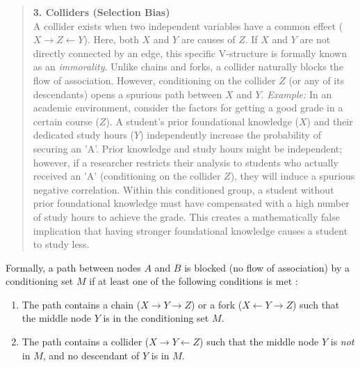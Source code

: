 \begin{quote}
\textbf{3. Colliders (Selection Bias)}\\
A collider exists when two independent variables have a common effect ($X \rightarrow Z \leftarrow Y$). Here, both $X$ and $Y$ are causes of $Z$. If $X$ and $Y$ are not directly connected by an edge, this specific V-structure is formally known as an \textit{immorality}. 
Unlike chains and forks, a collider naturally blocks the flow of association. However, conditioning on the collider $Z$ (or any of its descendants) opens a spurious path between $X$ and $Y$. 
\textit{Example:} In an academic environment, consider the factors for getting a good grade in a certain course ($Z$). A student's prior foundational knowledge ($X$) and their dedicated study hours ($Y$) independently increase the probability of securing an 'A'. Prior knowledge and study hours might be independent; however, if a researcher restricts their analysis to students who actually received an 'A' (conditioning on the collider $Z$), they will induce a spurious negative correlation. Within this conditioned group, a student without prior foundational knowledge must have compensated with a high number of study hours to achieve the grade. This creates a mathematically false implication that having stronger foundational knowledge causes a student to study less. 

\begin{center}
\end{center}
\end{quote}

Formally, a path between nodes $A$ and $B$ is blocked (no flow of association) by a conditioning set $M$ if at least one of the following conditions is met \cite{neal2020}:
\begin{enumerate}
    \item The path contains a chain ($X \rightarrow Y \rightarrow Z$) or a fork ($X \leftarrow Y \rightarrow Z$) such that the middle node $Y$ is in the conditioning set $M$.
    \item The path contains a collider ($X \rightarrow Y \leftarrow Z$) such that the middle node $Y$ is \textit{not} in $M$, and no descendant of $Y$ is in $M$.
\end{enumerate}

